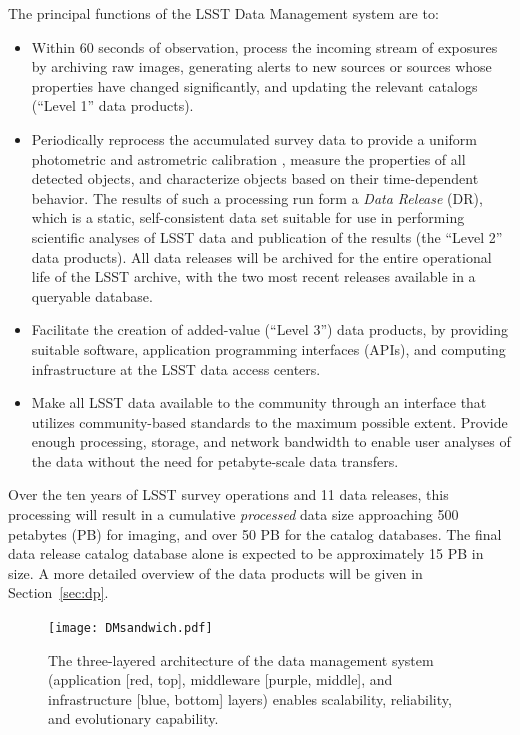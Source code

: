 \documentclass[11pt,twoside]{article}
\begin{document}
The principal functions of the LSST Data Management system \citep{lsstSRD} are to:
\begin{itemize}
\item Within 60 seconds of observation, process the incoming stream of exposures by archiving raw images, generating alerts to new sources or sources whose properties have changed significantly, and updating the relevant catalogs (``Level 1'' data products).
\item Periodically reprocess the accumulated survey data to provide a
  uniform photometric and astrometric calibration \citep[e.g.,][]{LSE-180}, measure the
  properties of all detected objects, and characterize objects based on their time-dependent behavior. The results of such a processing run form a {\em Data Release} (DR), which is a static, self-consistent data set suitable for use in performing scientific analyses of LSST data and publication of the results (the ``Level 2'' data products). All data releases will be archived for the entire operational life of the LSST
archive, with the two most recent releases available in a
queryable database.
\item Facilitate the creation of added-value (``Level 3'') data products, by providing suitable software,
  application programming interfaces (APIs),
and computing infrastructure at the LSST data access centers.
\item Make all LSST data available to the community through an interface that utilizes
community-based standards   to the maximum possible extent. Provide
  enough processing, storage, and network bandwidth to enable user
  analyses of the data without the need for petabyte-scale data
  transfers.
\end{itemize}

Over the ten years of LSST survey operations and 11 data releases, this processing will result in a cumulative {\em processed} data size
approaching 500 petabytes (PB) for imaging, and over 50 PB for the
catalog databases. The final data release catalog database alone is expected
to be approximately 15 PB in size. A more detailed overview of the data products will be given in
Section~\ref{sec:dp}.
\\

\begin{figure}[!t]
%
%
\begin{center}
\texttt{[image: DMsandwich.pdf]}
\end{center}
\caption{The three-layered architecture of the data management system
(application [red, top], middleware [purple, middle], and infrastructure [blue, bottom] layers) enables scalability, reliability, and evolutionary capability.}
\label{Fig:DM1}
\end{figure}
\end{document}
